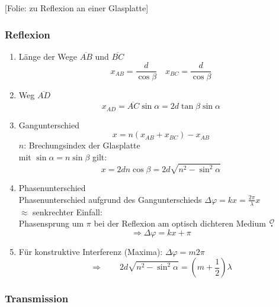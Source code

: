 \documentclass[titlepage,11pt,a4paper,ngerman]{report}
\newcommand{\ol}[1]{\overline{#1}}
\newcommand{\folie}[1]{\color{gray}[Folie: #1]\color{black}}
\newcommand{\mau}{$\buildrel \mathcal{O} \over{\textbf{.}}$}
\begin{document}
\folie{zu Reflexion an einer Glasplatte}\\

\subsubsection{Reflexion}

\begin{enumerate}[(1)]
	\item Länge der Wege $ \ol{AB} $ und $ \ol{BC} $
	\begin{equation*}
	x_{AB} = \frac{d}{\cos \beta} \quad x_{BC} = \frac{d}{\cos \beta}
	\end{equation*}
	\item Weg $ \ol{AD} $
	\begin{equation*}
	x_{AD} = \ol{AC} \sin \alpha = 2 d \tan \beta \sin \alpha
	\end{equation*}
	\item Gangunterschied
	\begin{equation*}
	x = n \left(x_{AB} + x _{BC}\right) - x_{AB}
	\end{equation*}
	$ n $: Brechungsindex der Glasplatte\\
	mit $ \sin \alpha = n \sin \beta $ gilt:
	\begin{equation*}
	x = 2 d n \cos \beta = 2 d \sqrt{n^2 - \sin^2 \alpha}
	\end{equation*}
	\item Phasenunterschied\\
	Phasenunterschied aufgrund des Gangunterschieds $ \Delta \varphi = kx = \frac{2\pi}{\lambda} x $\\
	$ \approx $ senkrechter Einfall:\\
	Phasensprung um $ \pi $ bei der Reflexion am optisch dichteren Medium \color{red!75!black} \mau \color{black}
	\begin{equation*}
	\Rightarrow \Delta \varphi = k x  + \pi
	\end{equation*}
	\item Für konstruktive Interferenz (Maxima): $ \Delta \varphi = m 2 \pi $
	\begin{equation*}
	\Rightarrow \qquad 2 d \sqrt{n^2 - \sin^2 \alpha} = \left(m + \frac{1}{2}\right) \lambda
	\end{equation*}
\end{enumerate}

\subsubsection{Transmission}
\end{document}
